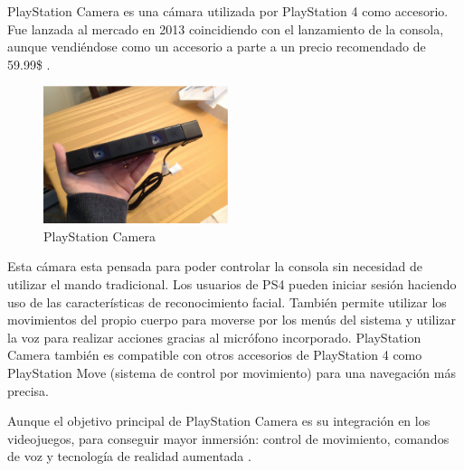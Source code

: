 

PlayStation Camera es una cámara utilizada por PlayStation 4 como accesorio. Fue
lanzada al mercado en 2013 coincidiendo con el lanzamiento de la consola, aunque
vendiéndose como un accesorio a parte a un precio recomendado de 59.99\$
\cite{PS4Camera}.

\begin{figure}
  \vspace{-20pt}
  \begin{center}
    \includegraphics[width=0.48\textwidth]{images/cap3/PlaystationCamera.eps}
  \end{center}
  \vspace{-20pt}
  \caption{PlayStation Camera}
  \vspace{-10pt}
  \label{fig:PlayStation-Camera}
\end{figure}

Esta cámara esta pensada para poder controlar la consola sin necesidad de
utilizar el mando tradicional. Los usuarios de PS4 pueden iniciar sesión
haciendo uso de las características de reconocimiento facial. También permite
utilizar los movimientos del propio cuerpo para moverse por los menús del
sistema y utilizar la voz para realizar acciones gracias al micrófono
incorporado. PlayStation Camera también es compatible con otros accesorios de
PlayStation 4 como PlayStation Move (sistema de control por movimiento) para una
navegación más precisa.

Aunque el objetivo principal de PlayStation Camera es su integración en los
videojuegos, para conseguir mayor inmersión: control de movimiento, comandos de
voz y tecnología de realidad aumentada \cite{PS4CameraFAQ}.

